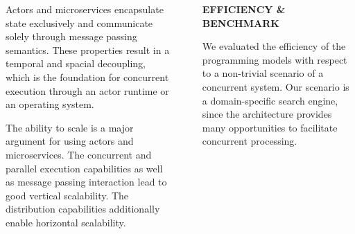 \documentclass[final,hyperref={pdfpagelabels=true}]{beamer}
\begin{document}
\begin{frame}
\begin{columns}[t]
\begin{column}{.43\textwidth}
{\begin{description}
          \vspace*{1.5\baselineskip}

          \item[\textbf{\textsf{Concurrent Execution}}] 
          \begin{justify}
          Actors and microservices encapsulate state exclusively and communicate solely through message passing semantics. These properties result in a temporal and spacial decoupling, which is the foundation for concurrent execution through an actor runtime or an operating system.
          \end{justify}

          \vspace*{1.5\baselineskip}

          \item[\textbf{\textsf{Scalability}}] 
          \begin{justify}
          The ability to scale is a major argument for using actors and microservices. The concurrent and parallel execution capabilities as well as message passing interaction lead to good vertical scalability. The distribution capabilities additionally enable horizontal scalability.
          \end{justify}
        \end{description}
        
      }
    \end{column}
    \begin{column}{.06\textwidth}
      \end{column}
    \begin{column}{.43\textwidth}
      \textsf{\textbf{EFFICIENCY \& BENCHMARK}} \\
      \vspace*{.5\baselineskip}
      {\lmodern
        \begin{justify}
        
        We evaluated the efficiency of the programming models with respect to a non-trivial scenario of a concurrent system. Our scenario is a domain-specific search engine, since the architecture provides many opportunities to facilitate concurrent processing. 

        \vspace*{1.4\baselineskip}
        

\end{justify}}
\end{column}
\end{columns}
\end{frame}
\end{document}
